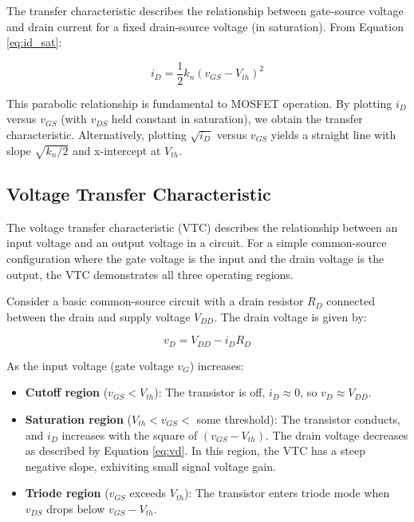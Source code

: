 \documentclass[10pt]{article}
\begin{document}
The transfer characteristic describes the relationship between gate-source voltage and drain current for a fixed drain-source voltage (in saturation). From Equation \ref{eq:id_sat}:

\begin{equation}
    i_D = \frac{1}{2} k_n (v_{GS} - V_{th})^2
\end{equation}

This parabolic relationship is fundamental to MOSFET operation.  By plotting $i_D$ versus $v_{GS}$ (with $v_{DS}$ held constant in saturation), we obtain the transfer characteristic.  Alternatively, plotting $\sqrt{i_D}$ versus $v_{GS}$ yields a straight line with slope $\sqrt{k_n/2}$ and x-intercept at $V_{th}$.

\subsection{Voltage Transfer Characteristic}

The voltage transfer characteristic (VTC) describes the relationship between an input voltage and an output voltage in a circuit. For a simple common-source configuration where the gate voltage is the input and the drain voltage is the output, the VTC demonstrates all three operating regions. 

Consider a basic common-source circuit with a drain resistor $R_D$ connected between the drain and supply voltage $V_{DD}$. The drain voltage is given by:

\begin{equation}
    v_D = V_{DD} - i_D R_D
    \label{eq:vd}
\end{equation}

As the input voltage (gate voltage $v_G$) increases:

\begin{itemize}
    \item \textbf{Cutoff region} ($v_{GS} < V_{th}$): The transistor is off, $i_D \approx 0$, so $v_D \approx V_{DD}$. 
    
    \item \textbf{Saturation region} ($V_{th} < v_{GS} < $ some threshold): The transistor conducts, and $i_D$ increases with the square of $(v_{GS} - V_{th})$. The drain voltage decreases as described by Equation \ref{eq:vd}. In this region, the VTC has a steep negative slope, exhiviting small signal voltage gain.
    
    \item \textbf{Triode region} ($v_{GS}$ exceeds $V_{th}$): The transistor enters triode mode when $v_{DS}$ drops below $v_{GS} - V_{th}$. 
\end{itemize}
\end{document}

